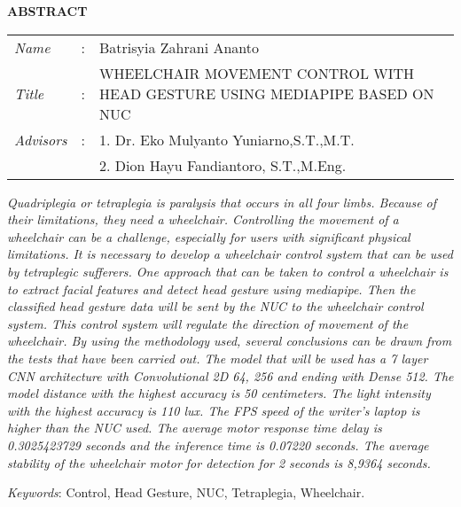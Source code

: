 \begin{center}
  \large\textbf{ABSTRACT}
\end{center}


\vspace{2ex}

\begingroup
\setlength{\tabcolsep}{0pt}

\noindent
\begin{tabularx}{\textwidth}{l >{\centering}m{3em} X}
  \emph{Name}     & : & Batrisyia Zahrani Ananto        \\

  \emph{Title}    & : & WHEELCHAIR MOVEMENT CONTROL WITH HEAD GESTURE
USING MEDIAPIPE BASED ON NUC   \\

  \emph{Advisors} & : & 1. Dr. Eko Mulyanto Yuniarno,S.T.,M.T.  \\
                  &   & 2. Dion Hayu Fandiantoro, S.T.,M.Eng. \\
\end{tabularx}
\endgroup

\emph{Quadriplegia or tetraplegia is paralysis that occurs in all four limbs. Because of their limitations, they need a wheelchair. Controlling the movement of a wheelchair can be a challenge, especially for users with significant physical limitations. It is necessary to develop a wheelchair control system that can be used by tetraplegic sufferers. One approach that can be taken to control a wheelchair is to extract facial features and detect head gesture using mediapipe. Then the classified head gesture data will be sent by the NUC to the wheelchair control system. This control system will regulate the direction of movement of the wheelchair. By using the methodology used, several conclusions can be drawn from the tests that have been carried out. The model that will be used has a 7 layer CNN architecture with Convolutional 2D 64, 256 and ending with Dense 512. The model distance with the highest accuracy is 50 centimeters. The light intensity with the highest accuracy is 110 lux. The FPS speed of the writer's laptop is higher than the NUC used. The average motor response time delay is 0.3025423729 seconds and the inference time is 0.07220 seconds. The average stability of the wheelchair motor for detection for 2 seconds is 8,9364 seconds.}

\emph{Keywords}: Control, Head Gesture, NUC, Tetraplegia, Wheelchair.
